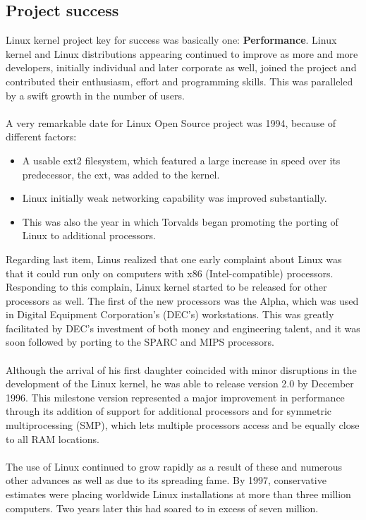\documentclass[11pt]{article}
\begin{document}
\subsection{Project success}
Linux kernel project key for success was basically one: \textbf{Performance}. Linux kernel and Linux distributions appearing continued to improve as more and more developers, initially individual and later corporate as well, joined the project and contributed their enthusiasm, effort and programming skills. This was paralleled by a swift growth in the number of users.\\
\\
A very remarkable date for Linux Open Source project was 1994, because of different factors:
\begin{itemize}\itemsep0pt
\item{A usable ext2 filesystem, which featured a large increase in speed over its predecessor, the ext, was added to the kernel.}
\item{Linux initially weak networking capability was improved substantially.}
\item{This was also the year in which Torvalds began promoting the porting of Linux to additional processors.}
\end{itemize}
Regarding last item, Linus realized that one early complaint about Linux was that it could run only on computers with x86 (Intel-compatible) processors. Responding to this complain, Linux kernel started to be released for other processors as well. The first of the new processors was the Alpha, which was used in Digital Equipment Corporation's (DEC's) workstations. This was greatly facilitated by DEC's investment of both money and engineering talent, and it was soon followed by porting to the SPARC and MIPS processors.\\
\\
Although the arrival of his first daughter coincided with minor disruptions in the development of the Linux kernel, he was able to release version 2.0 by December 1996. This milestone version represented a major improvement in performance through its addition of support for additional processors and for symmetric multiprocessing (SMP), which lets multiple processors access and be equally close to all RAM locations.\\
\\
The use of Linux continued to grow rapidly as a result of these and numerous other advances as well as due to its spreading fame. By 1997, conservative estimates were placing worldwide Linux installations at more than three million computers. Two years later this had soared to in excess of seven million.\\
\end{document}
